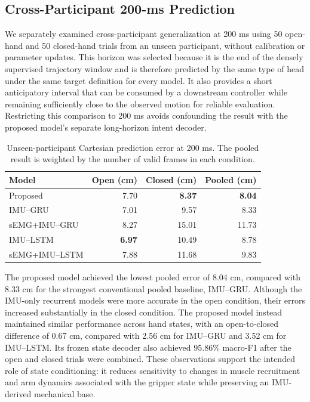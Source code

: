 \subsection{Cross-Participant 200-ms Prediction}
\label{subsec:unseen-200ms}

We separately examined cross-participant generalization at 200 ms using
50 open-hand and 50 closed-hand trials from an unseen participant, without
calibration or parameter updates. This horizon was selected because it is the
end of the densely supervised trajectory window and is therefore predicted by
the same type of head under the same target definition for every model. It
also provides a short anticipatory interval that can be consumed by a
downstream controller while remaining sufficiently close to the observed
motion for reliable evaluation. Restricting this comparison to 200 ms avoids
confounding the result with the proposed model's separate long-horizon intent
decoder.

\begin{table}[t]
 \centering
 \caption{Unseen-participant Cartesian prediction error at 200 ms. The pooled
 result is weighted by the number of valid frames in each condition.}
 \label{tab:unseen-200ms}
 \small
 \setlength{\tabcolsep}{4pt}
 \begin{tabular}{lrrr}
  \hline
  Model & Open (cm) & Closed (cm) & Pooled (cm) \\
  \hline
  Proposed       & 7.70 & \textbf{8.37} & \textbf{8.04} \\
  IMU--GRU       & 7.01 & 9.57 & 8.33 \\
  sEMG+IMU--GRU  & 8.27 & 15.01 & 11.73 \\
  IMU--LSTM      & \textbf{6.97} & 10.49 & 8.78 \\
  sEMG+IMU--LSTM & 7.88 & 11.68 & 9.83 \\
  \hline
 \end{tabular}
\end{table}

The proposed model achieved the lowest pooled error of 8.04 cm, compared with
8.33 cm for the strongest conventional pooled baseline, IMU--GRU. Although the
IMU-only recurrent models were more accurate in the open condition, their
errors increased substantially in the closed condition. The proposed model
instead maintained similar performance across hand states, with an
open-to-closed difference of 0.67 cm, compared with 2.56 cm for IMU--GRU and
3.52 cm for IMU--LSTM. Its frozen state decoder also achieved 95.86\%
macro-F1 after the open and closed trials were combined. These observations
support the intended role of state conditioning: it reduces sensitivity to
changes in muscle recruitment and arm dynamics associated with the gripper
state while preserving an IMU-derived mechanical base.

